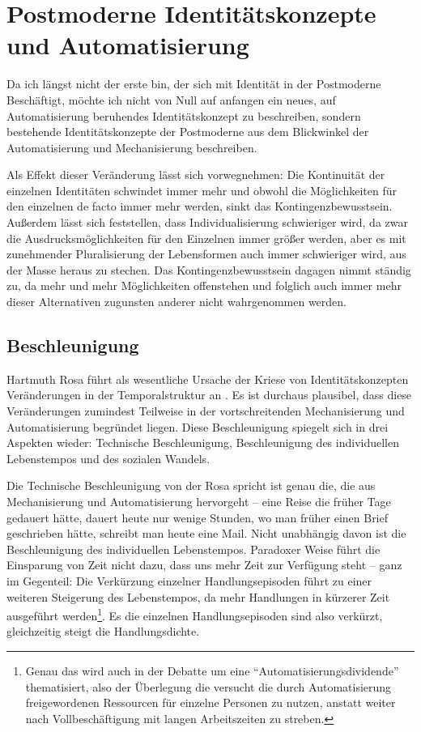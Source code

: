 \section{Postmoderne Identitätskonzepte und Automatisierung}

Da ich längst nicht der erste bin, der sich mit Identität in der Postmoderne Beschäftigt, möchte ich nicht von Null auf anfangen ein neues, auf Automatisierung beruhendes Identitätskonzept zu beschreiben, sondern bestehende Identitätskonzepte der Postmoderne aus dem Blickwinkel der Automatisierung und Mechanisierung beschreiben.

Als Effekt dieser Veränderung lässt sich vorwegnehmen: Die Kontinuität der einzelnen Identitäten schwindet immer mehr und obwohl die Möglichkeiten für den einzelnen de facto immer mehr werden, sinkt das Kontingenzbewusstsein.
Außerdem lässt sich feststellen, dass Individualisierung schwieriger wird, da zwar die Ausdrucksmöglichkeiten für den Einzelnen immer größer werden, aber es mit zunehmender Pluralisierung der Lebensformen auch immer schwieriger wird, aus der Masse heraus zu stechen.
Das Kontingenzbewusstsein dagagen nimmt ständig zu, da mehr und mehr Möglichkeiten offenstehen und folglich auch immer mehr dieser Alternativen zugunsten anderer nicht wahrgenommen werden.

\subsection{Beschleunigung}

Hartmuth Rosa führt als wesentliche Ursache der Kriese von Identitätskonzepten Veränderungen in der Temporalstruktur an \parencite{rosa}.
Es ist durchaus plausibel, dass diese Veränderungen zumindest Teilweise in der vortschreitenden Mechanisierung und Automatisierung begründet liegen.
Diese Beschleunigung spiegelt sich in drei Aspekten wieder: Technische Beschleunigung, Beschleunigung des individuellen Lebenstempos und des sozialen Wandels.

Die Technische Beschleunigung von der Rosa spricht ist genau die, die aus Mechanisierung und Automatisierung hervorgeht – eine Reise die früher Tage gedauert hätte, dauert heute nur wenige Stunden, wo man früher einen Brief geschrieben hätte, schreibt man heute eine Mail.
Nicht unabhängig davon ist die Beschleunigung des individuellen Lebenstempos.
Paradoxer Weise führt die Einsparung von Zeit nicht dazu, dass uns mehr Zeit zur Verfügung steht – ganz im Gegenteil: Die Verkürzung einzelner Handlungsepisoden führt zu einer weiteren Steigerung des Lebenstempos, da mehr Handlungen in kürzerer Zeit ausgeführt werden\footnote{Genau das wird auch in der Debatte um eine \enquote{Automatisierungsdividende} thematisiert, also der Überlegung die versucht die durch Automatisierung freigewordenen Ressourcen für einzelne Personen zu nutzen, anstatt weiter nach Vollbeschäftigung mit langen Arbeitszeiten zu streben\parencite{faz}.}.
Es die einzelnen Handlungsepisoden sind also verkürzt, gleichzeitig steigt die Handlungsdichte.


